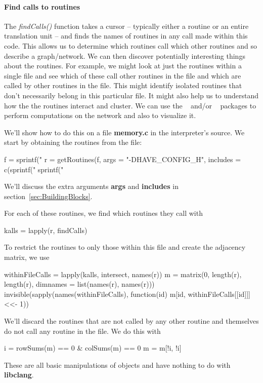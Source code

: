 \documentclass[article]{jss}
\def\R{\proglang{R}}
\def\Rpkg#1{\pkg{#1}}
\def\Rfunc#1{\textsl{#1()}}
\def\file#1{\textbf{#1}}
\def\Rarg#1{\textbf{#1}}
\def\libclang{\textbf{libclang}}
\begin{document}
\paragraph{Find calls to routines}
The \Rfunc{findCalls} function takes a cursor -- typically either a
routine or an entire translation unit -- and finds the names of
routines in any call made within this code.  This allows us to
determine which routines call which other routines and so describe a
graph/network.  We can then discover potentially interesting things
about the routines.  For example, we might look at just the routines
within a single file and see which of these call other routines in the
file and which are called by other routines in the file.  This might
identify isolated routines that don't necessarily belong in this
particular file. It might also help us to understand how the the
routines interact and cluster.  We can use the \Rpkg{igraph}~\citep{bib:igraph} and/or
\Rpkg{graph}~\citep{bib:graphPkg} packages to perform computations on the network and also
to visualize it.

We'll show how to do this on a file \file{memory.c} in the \R{}
interpreter's source.
We start by obtaining the routines from the file:
\begin{RCode}
f = sprintf("%
r = getRoutines(f, args = "-DHAVE_CONFIG_H",
                  includes = c(sprintf("%
                               sprintf("%
\end{RCode}
We'll discuss the extra arguments \Rarg{args} and \Rarg{includes} in section~\ref{sec:BuildingBlocks}.

For each of these routines, we find which routines they call with
\begin{RCode}
kalls = lapply(r, findCalls)
\end{RCode}
To restrict the routines to only those within this file
and create the adjacency matrix, we use 
\begin{RCode}
withinFileCalls = lapply(kalls, intersect, names(r))    
m = matrix(0, length(r), length(r), dimnames = list(names(r), names(r)))
invisible(sapply(names(withinFileCalls), 
           function(id) 
              m[id,  withinFileCalls[[id]]] <<- 1))
\end{RCode}
We'll discard the routines that are not called by any other routine
and themselves do not call any routine in the file. We do this with
\begin{RCode}
i = rowSums(m) == 0 & colSums(m) == 0
m = m[!i, !i]  
\end{RCode}
These are all basic \R{} manipulations of \R{} objects and have
nothing to do with \libclang.
\end{document}
